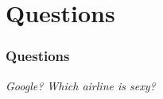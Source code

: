 \documentclass{beamer}
\begin{document}
\section{Questions}
\begin{frame}
\frametitle{Questions}
\begin{center}
\emph{Google? Which airline is sexy?}
\end{center}



\end{frame}

 
\end{document}
